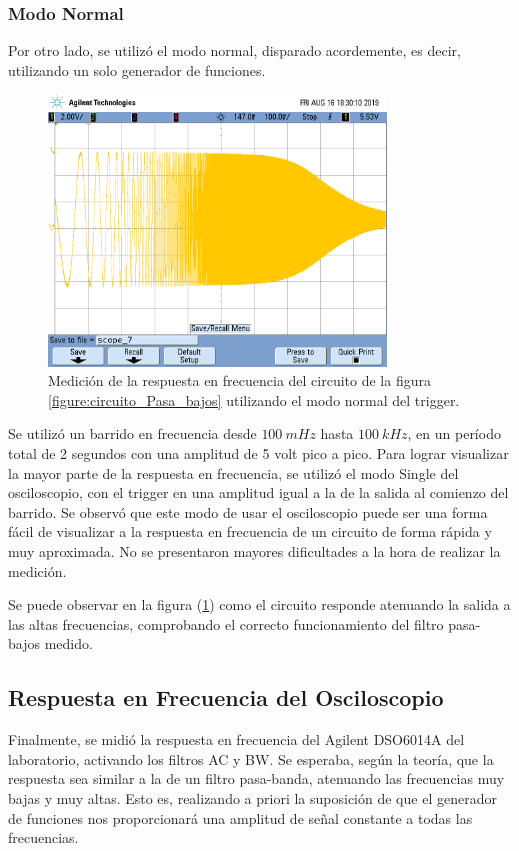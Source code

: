\documentclass[11pt, a4paper]{article}
\begin{document}
\subsubsection*{Modo Normal}
Por otro lado, se utilizó el modo normal, disparado acordemente, es decir, utilizando un solo generador de funciones.
\begin{figure}[H]
	\centering
	\includegraphics[width=0.8\textwidth,trim={0.6cm 7cm  1 5cm},clip]{ej3normal.png}
	\caption{Medición de la respuesta en frecuencia del circuito de la figura \ref{figure:circuito_Pasa_bajos} utilizando el modo normal del trigger.} 
	\label{graf:ej3modonormal}
\end{figure}
Se utilizó un barrido en frecuencia desde $100 \ mHz$ hasta $100 \ kHz$, en un período total de 2 segundos con una amplitud de 5 volt pico a pico. Para lograr visualizar la mayor parte de la respuesta en frecuencia, se utilizó el modo Single del osciloscopio, con el trigger en una amplitud igual a la de la salida al comienzo del barrido. Se observó que este modo de usar el osciloscopio puede ser una forma fácil de visualizar a la respuesta en frecuencia de un circuito de forma rápida y muy aproximada. No se presentaron mayores dificultades a la hora de realizar la medición.

Se puede observar en la figura (\ref{graf:ej3modonormal}) como el circuito responde atenuando la salida a las altas frecuencias, comprobando el correcto funcionamiento del filtro pasa-bajos medido.

\break

\subsection*{Respuesta en Frecuencia del Osciloscopio}
Finalmente, se midió la respuesta en frecuencia del Agilent DSO6014A del laboratorio, activando los filtros AC y BW. Se esperaba, según la teoría, que la respuesta sea similar a la de un filtro pasa-banda, atenuando las frecuencias muy bajas y muy altas. Esto es, realizando a priori la suposición de que el generador de funciones nos proporcionará una amplitud de señal constante a todas las frecuencias.
\end{document}
